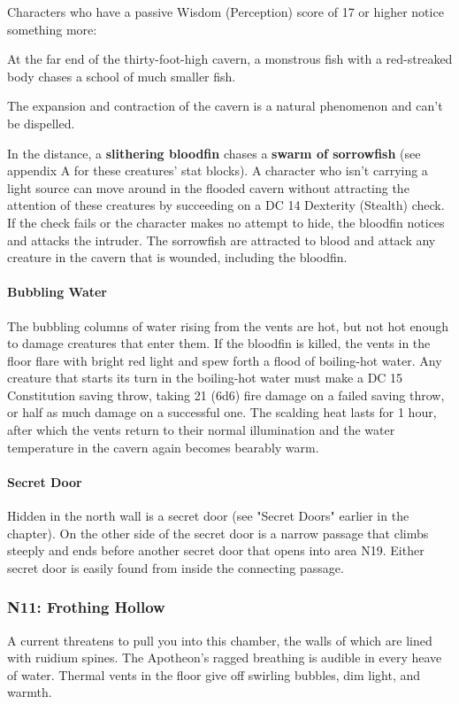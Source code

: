 \documentclass[10pt,a4paper,twoside,twocolumn,openany,nodeprecatedcode]{dndbook}
\begin{document}
Characters who have a passive Wisdom (Perception) score of 17 or higher notice something more:

\begin{DndReadAloud}{}
At the far end of the thirty-foot-high cavern, a monstrous fish with a red-streaked body chases a school of much smaller fish.

\end{DndReadAloud}

The expansion and contraction of the cavern is a natural phenomenon and can't be dispelled.

In the distance, a \textbf{slithering bloodfin} chases a \textbf{swarm of sorrowfish} (see appendix A for these creatures' stat blocks). A character who isn't carrying a light source can move around in the flooded cavern without attracting the attention of these creatures by succeeding on a DC 14 Dexterity (Stealth) check. If the check fails or the character makes no attempt to hide, the bloodfin notices and attacks the intruder. The sorrowfish are attracted to blood and attack any creature in the cavern that is wounded, including the bloodfin.

\paragraph{Bubbling Water}
The bubbling columns of water rising from the vents are hot, but not hot enough to damage creatures that enter them. If the bloodfin is killed, the vents in the floor flare with bright red light and spew forth a flood of boiling-hot water. Any creature that starts its turn in the boiling-hot water must make a DC 15 Constitution saving throw, taking 21 (6d6) fire damage on a failed saving throw, or half as much damage on a successful one. The scalding heat lasts for 1 hour, after which the vents return to their normal illumination and the water temperature in the cavern again becomes bearably warm.

\paragraph{Secret Door}
Hidden in the north wall is a secret door (see "Secret Doors" earlier in the chapter). On the other side of the secret door is a narrow passage that climbs steeply and ends before another secret door that opens into area N19. Either secret door is easily found from inside the connecting passage.

\subsubsection{N11: Frothing Hollow}
\begin{DndReadAloud}{}
A current threatens to pull you into this chamber, the walls of which are lined with ruidium spines. The Apotheon's ragged breathing is audible in every heave of water. Thermal vents in the floor give off swirling bubbles, dim light, and warmth.

\end{DndReadAloud}
\end{document}
